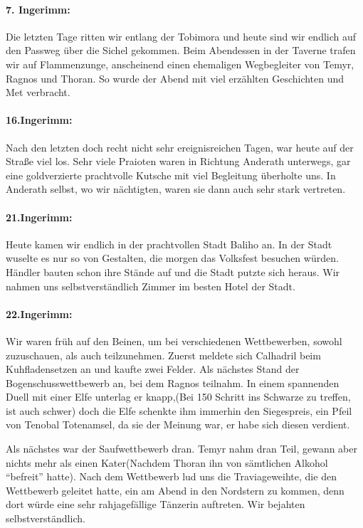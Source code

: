 \paragraph{7. Ingerimm:}
Die letzten Tage ritten wir entlang der Tobimora und heute sind wir endlich auf den Passweg über die Sichel gekommen. Beim Abendessen in der Taverne trafen wir auf Flammenzunge, anscheinend einen ehemaligen Wegbegleiter von Temyr, Ragnos und Thoran. So wurde der Abend mit viel erzählten Geschichten und Met verbracht.

\paragraph{16.Ingerimm:}
Nach den letzten doch recht nicht sehr ereignisreichen Tagen, war heute auf der Straße viel los. Sehr viele Praioten waren in Richtung Anderath unterwegs, gar eine goldverzierte prachtvolle Kutsche mit viel Begleitung überholte uns. In Anderath selbst, wo wir nächtigten, waren sie dann auch sehr stark vertreten.

\paragraph{21.Ingerimm:}
Heute kamen wir endlich in der prachtvollen Stadt Baliho an. In der Stadt wuselte es nur so von Gestalten, die morgen das Volksfest besuchen würden. Händler bauten schon ihre Stände auf und die Stadt putzte sich heraus. Wir nahmen uns selbstverständlich Zimmer im besten Hotel der Stadt.

\paragraph{22.Ingerimm:}
Wir waren früh auf den Beinen, um bei verschiedenen Wettbewerben, sowohl zuzuschauen, als auch teilzunehmen. Zuerst meldete sich Calhadril beim Kuhfladensetzen an und kaufte zwei Felder. Als nächstes Stand der Bogenschusswettbewerb an, bei dem Ragnos teilnahm. In einem spannenden Duell mit einer Elfe unterlag er knapp,(Bei 150 Schritt ins Schwarze zu treffen, ist auch schwer) doch die Elfe schenkte ihm immerhin den Siegespreis, ein Pfeil von Tenobal Totenamsel, da sie der Meinung war, er habe sich diesen verdient.

Als nächstes war der Saufwettbewerb dran. Temyr nahm dran Teil, gewann aber nichts mehr als einen Kater(Nachdem Thoran ihn von sämtlichen Alkohol ``befreit'' hatte). Nach dem Wettbewerb lud uns die Traviageweihte, die den Wettbewerb geleitet hatte, ein am Abend in den Nordstern zu kommen, denn dort würde eine sehr rahjagefällige Tänzerin auftreten. Wir bejahten selbstverständlich.

